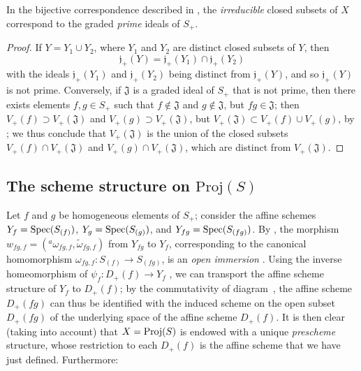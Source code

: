 \begin{corollary}[2.3.17]
\label{II.2.3.17}
In the bijective correspondence described in , the \emph{irreducible} closed subsets of $X$ correspond to the graded \emph{prime} ideals of $S_+$.
\end{corollary}

\begin{proof}
If $Y=Y_1\cup Y_2$, where $Y_1$ and $Y_2$ are distinct closed subsets of $Y$, then
\[
  \mathfrak{j}_+(Y) = \mathfrak{j}_+(Y_1)\cap\mathfrak{j}_+(Y_2)
\]
with the ideals $\mathfrak{j}_+(Y_1)$ and $\mathfrak{j}_+(Y_2)$ being distinct from $\mathfrak{j}_+(Y)$, and so $\mathfrak{j}_+(Y)$ is not prime.
Conversely, if $\mathfrak{J}$ is a graded ideal of $S_+$ that is not prime, then there exists elements $f,g\in S_+$ such that $f\not\in\mathfrak{J}$ and $g\not\in\mathfrak{J}$, but $fg\in\mathfrak{J}$;
then $V_+(f)\supset V_+(\mathfrak{J})$ and $V_+(g)\supset V_+(\mathfrak{J})$, but $V_+(\mathfrak{J})\subset V_+(f)\cup V_+(g)$, by ;
we thus conclude that $V_+(\mathfrak{J})$ is the union of the closed subsets $V_+(f)\cap V_+(\mathfrak{J})$ and $V_+(g)\cap V_+(\mathfrak{J})$, which are distinct from $V_+(\mathfrak{J})$.
\end{proof}


\subsection{The scheme structure on $\mathrm{Proj}(S)$}
\label{subsection:II.2.4}

\begin{env}[2.4.1]
\label{II.2.4.1}
Let $f$ and $g$ be homogeneous elements of $S_+$;
consider the affine schemes $Y_f=\operatorname{Spec}(S_{(f)})$, $Y_g=\operatorname{Spec}(S_{(g)})$, and $Y_{fg}=\operatorname{Spec}(S_{(fg)})$.
By , the morphism $w_{fg,f} = ({}^a\!\omega_{fg,f},\widetilde{\omega}_{fg,f})$ from $Y_{fg}$ to $Y_f$, corresponding to the canonical homomorphism $\omega_{fg,f}: S_{(f)}\to S_{(fg)}$, is an \emph{open immersion} .
Using the inverse homeomorphism of $\psi_f: D_+(f)\to Y_f$ , we can transport the affine scheme structure of $Y_f$ to $D_+(f)$;
by the commutativity of diagram~, the affine scheme $D_+(fg)$ can thus be identified with the induced scheme on the open subset $D_+(fg)$ of the underlying space of the affine scheme $D_+(f)$.
It is then clear (taking  into account) that $X=\operatorname{Proj}(S)$ is endowed with a unique \emph{prescheme} structure, whose restriction to each $D_+(f)$ is the affine scheme that we have just defined.
Furthermore:
\end{env}

